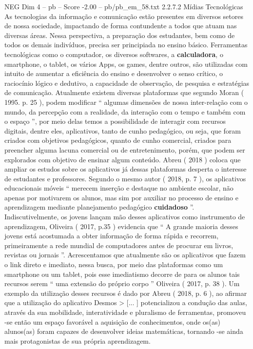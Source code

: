 \begin{textsample}{NEG Dim 4 – pb – Score -2.00 – pb/pb\_em\_58.txt}  \label{ex:f4_neg_028}
2.2.7.2 Mídias Tecnológicas As tecnologias da informação e comunicação estão presentes em diversos setores de nossa sociedade, impactando de forma contundente a todos que atuam nas diversas áreas.
Nessa perspectiva, a preparação dos estudantes, bem como de todos os demais indivíduos, precisa ser principiada no ensino básico.
Ferramentas tecnológicas como o computador, os diversos softwares, a \textbf{calculadora}, o smartphone, o tablet, os vários Apps, os games, dentre outros, são utilizadas com intuito de aumentar a eficiência do ensino e desenvolver o senso crítico, o raciocínio lógico e dedutivo, a capacidade de observação, de pesquisa e estratégias de comunicação.
Atualmente existem diversas plataformas que segundo Moran ( 1995. p. 25 ), podem modificar “ algumas dimensões de nossa inter-relação com o mundo, da percepção com a realidade, da interação com o tempo e também com o espaço ”, por meio delas temos a possibilidade de interagir com recursos digitais, dentre eles, aplicativos, tanto de cunho pedagógico, ou seja, que foram criados com objetivos pedagógicos, quanto de cunho comercial, criados para preencher alguma lacuna comercial ou de entretenimento, porém, que podem ser explorados com objetivo de ensinar algum conteúdo.
Abreu ( 2018 ) coloca que ampliar os estudos sobre os aplicativos já dessas plataformas desperta o interesse de estudantes e professores.
Segundo o mesmo autor ( 2018, p. 7 ), os aplicativos educacionais móveis “ merecem inserção e destaque no ambiente escolar, não apenas por motivarem os alunos, mas sim por auxiliar no processo de ensino e aprendizagem mediante planejamento pedagógico \textbf{cuidadoso} ”.
Indiscutivelmente, os jovens lançam mão desses aplicativos como instrumento de aprendizagem, Oliveira ( 2017, p.35 ) evidencia que “ A grande maioria desses jovens está acostumada a obter informação de forma rápida e recorrem, primeiramente a rede mundial de computadores antes de procurar em livros, revistas ou jornais ”.
Acrescentamos que atualmente são os aplicativos que fazem o link direto e imediato, nessa busca, por meio das plataformas como um smartphone ou um tablet, pois esse imediatismo decorre de para os alunos tais recursos serem “ uma extensão do próprio corpo ” Oliveira ( 2017, p. 38 ).
Um exemplo da utilização desses recursos é dado por Abreu ( 2018, p. 6 ), ao afirmar que a utilização do aplicativo Desmos > [... ] potencializou a condução das aulas, através da sua mobilidade, interatividade e pluralismo de ferramentas, promoveu -se então um espaço favorável a aquisição de conhecimentos, onde os(as) alunos(as) foram capazes de desenvolver ideias matemáticas, tornando -se ainda mais protagonistas de sua própria aprendizagem.

\end{textsample}
